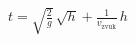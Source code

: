 \documentclass[preview]{standalone}
\begin{document}
\begin{align*}
t = \sqrt{\frac{2}{g}} \,  \sqrt{h } + \frac{1}{v_{\text{zvuk}}} \,  h
\end{align*}
\end{document}
